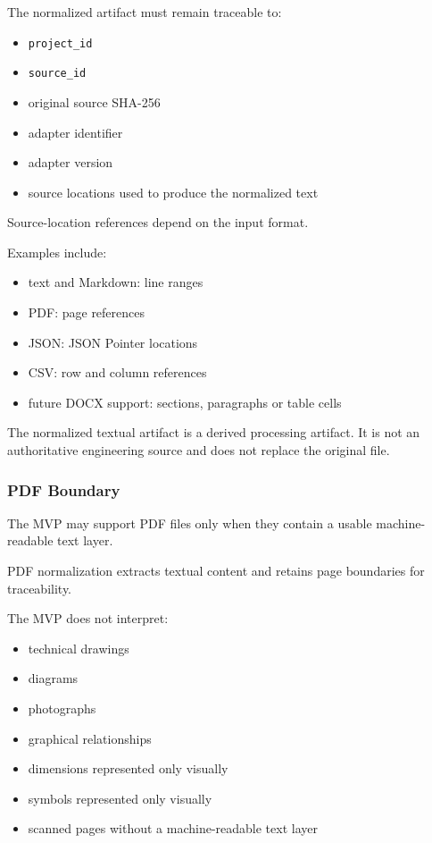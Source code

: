 The normalized artifact must remain traceable to:

\begin{itemize}
\tightlist
\item
  \texttt{project\_id}
\item
  \texttt{source\_id}
\item
  original source SHA-256
\item
  adapter identifier
\item
  adapter version
\item
  source locations used to produce the normalized text
\end{itemize}

Source-location references depend on the input format.

Examples include:

\begin{itemize}
\tightlist
\item
  text and Markdown: line ranges
\item
  PDF: page references
\item
  JSON: JSON Pointer locations
\item
  CSV: row and column references
\item
  future DOCX support: sections, paragraphs or table cells
\end{itemize}

The normalized textual artifact is a derived processing artifact. It is not an authoritative engineering source and does not replace the original file.

\hypertarget{pdf-boundary}{%
\subsubsection{PDF Boundary}\label{pdf-boundary}}

The MVP may support PDF files only when they contain a usable machine-readable text layer.

PDF normalization extracts textual content and retains page boundaries for traceability.

The MVP does not interpret:

\begin{itemize}
\tightlist
\item
  technical drawings
\item
  diagrams
\item
  photographs
\item
  graphical relationships
\item
  dimensions represented only visually
\item
  symbols represented only visually
\item
  scanned pages without a machine-readable text layer
\end{itemize}

